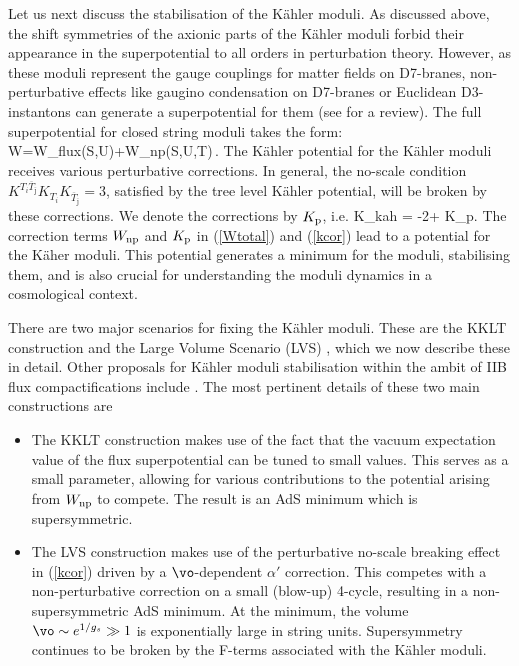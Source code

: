 Let us next discuss the stabilisation of the K\"ahler moduli. As discussed above, the shift symmetries of the axionic parts of the K\"ahler moduli forbid their appearance in the superpotential to all orders in perturbation theory. However, as these moduli represent the gauge couplings for matter fields on D7-branes, non-perturbative effects like gaugino condensation on D7-branes or Euclidean D3-instantons can generate a superpotential for them (see  \cite{Blumenhagen:2009qh} for a review). The full superpotential for closed string moduli takes the form:
\be
W=W_{\rm flux}(S,U)+W_{\rm np}(S,U,T)\,.
\label{Wtotal}
\ee
The K\"ahler potential  for the K\"ahler  moduli receives various perturbative corrections. In general,
the no-scale condition $K^{T_i\overline{T}_{\bar{\jmath}}} K_{T_i} K_{\overline{T}_{\bar{\jmath}}}=3$, satisfied by the tree level K\"ahler potential, will be 
broken by these corrections. We denote the corrections by $K_{\rm p}$, i.e. 
\be
\label{kcor}
  K_{\rm kah} =  -2\ln\vo + K_{\rm p}.
 \ee
The correction terms $W_{\rm np}$ and $K_{\rm p}$ in (\ref{Wtotal}) and (\ref{kcor}) lead to a potential for the K\"aher moduli. This potential generates a minimum for the moduli,
stabilising them, and is also crucial for understanding the moduli dynamics in a cosmological context.

There are two major scenarios for fixing the K\"ahler moduli. These are the  KKLT construction \cite{Kachru:2003aw} and the Large Volume Scenario (LVS) \cite{Balasubramanian:2005zx}, which we now describe these in detail. Other proposals for K\"ahler moduli stabilisation within the ambit of IIB flux compactifications include \cite{vonGersdorff:2005bf, Berg:2005yu, Westphal:2006tn, Cicoli:2012fh,Gallego:2017dvd, Antoniadis:2018hqy, AbdusSalam:2020ywo}. The most pertinent details of these two main constructions are   
\begin{itemize}
    
\item The KKLT construction  makes use of the fact that the vacuum expectation value of the flux superpotential can be tuned to small values. 
   This serves as a small parameter, allowing for various contributions to the potential arising from $W_{\rm np}$ to compete. The result is 
   an AdS minimum which is supersymmetric.
   
\item The LVS construction makes use of the perturbative no-scale breaking effect in  (\ref{kcor}) driven by  a $\vo$-dependent $\alpha'$ correction. This competes with a non-perturbative correction on a small (blow-up) 4-cycle, resulting in a non-supersymmetric AdS minimum. At the minimum, the volume $\vo\sim e^{1/g_s}\gg 1$ is exponentially large in string units. Supersymmetry continues to be broken by the F-terms associated with the K\"ahler moduli.
\end{itemize}


